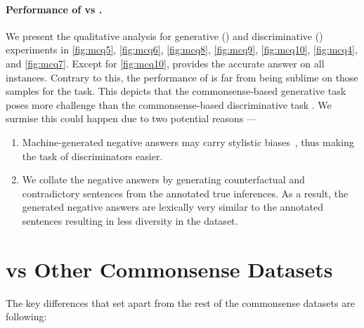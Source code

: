 \paragraph{Performance of \dataset{} vs \dataset{}.}
We present the qualitative analysis for generative (\dataset{}) and discriminative (\dataset{}) experiments in \cref{fig:mcq5}, \cref{fig:mcq6}, \cref{fig:mcq8}, \cref{fig:mcq9}, \cref{fig:mcq10}, \cref{fig:mcq4}, and \cref{fig:mcq7}. Except for \cref{fig:mcq10},  provides the accurate answer on all instances. Contrary to this, the performance of  is far from being sublime on those samples for the \dataset{} task. This depicts that the commonsense-based generative task \dataset{} poses more challenge than the commonsense-based discriminative task \dataset{}. We surmise this could happen due to two potential reasons --- 
\begin{enumerate}
    \item Machine-generated negative answers may carry stylistic biases~\cite{zellers2018swag}, thus making the task of discriminators easier.
    \item We collate the negative answers by generating counterfactual and contradictory sentences from the annotated true inferences. As a result, the generated negative answers are lexically very similar to the annotated sentences resulting in less diversity in the dataset. 
\end{enumerate}

\begin{table}[h!]
\centering
\small
{}
\caption{Results of baseline models in other CSK datasets. Note: This result on \dataset{} using  is obtained for only instances with single answer. }
\label{tab:other-csk-sup}
\end{table} 
\section{\dataset{} vs Other Commonsense Datasets}
The key differences that set \dataset{} apart from the rest of the commonsense datasets are following:

